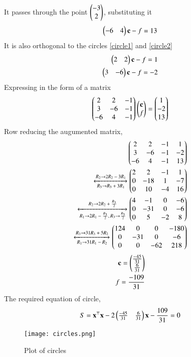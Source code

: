 \documentclass[journal,12pt,twocolumn]{IEEEtran}
\begin{document}
It passes through the point $\begin{pmatrix}-3\\2\end{pmatrix}$, substituting it
\begin{align}
    \begin{pmatrix}-6&4\end{pmatrix}\mathbf{c} - f = 13  
\end{align}
It is also orthogonal to the circles \eqref{circle1} and \eqref{circle2}
\begin{align}
    \begin{pmatrix}2&2\end{pmatrix}\mathbf{c} - f = 1\\
    \begin{pmatrix}3&-6\end{pmatrix}\mathbf{c} - f = -2
\end{align}
Expressing in the form of a matrix
\begin{align}
    \begin{pmatrix}2&2&-1\\3&-6&-1\\-6&4&-1\end{pmatrix}\begin{pmatrix}\mathbf{c}\\f\end{pmatrix} = \begin{pmatrix}1\\-2\\13\end{pmatrix}
\end{align}
Row reducing the augumented matrix,
\begin{align}
    \begin{pmatrix}2&2&-1&1\\3&-6&-1&-2\\-6&4&-1&13\end{pmatrix} \\ \xleftrightarrow[\text{$R_3$}\rightarrow{\text{$R_3 + 3R_1$}}] {\text{$R_2$}\rightarrow{\text{$2R_2 - 3R_1$}}} \begin{pmatrix}2&2&-1&1\\0&-18&1&-7\\0&10&-4&16\end{pmatrix}\\
    \xleftrightarrow[\text{$R_1$}\rightarrow{\text{$2R_1 - \frac{R_3}{2}$}} \text{$,R_3$}\rightarrow{\text{$\frac{R_3}{2}$}} ] {\text{$R_2$}\rightarrow{\text{$2R_2 + \frac{R_3}{2}$}}} \begin{pmatrix}4&-1&0&-6\\0&-31&0&-6\\0&5&-2&8\end{pmatrix}\\
    \xleftrightarrow[\text{$R_1$}\rightarrow{\text{$31R_1 - R_2$}}] {\text{$R_3$}\rightarrow{\text{$31R_3 + 5R_2$}}} \begin{pmatrix}124&0&0&-180\\0&-31&0&-6\\0&0&-62&218\end{pmatrix}
\end{align}
\begin{align}
    \mathbf{c} = \begin{pmatrix}\frac{-45}{31}\\\frac{6}{31}\end{pmatrix}\\
    f = \frac{-109}{31}
\end{align}
The required equation of circle,
\begin{align}
    S = \mathbf{x}^\top\mathbf{x} - 2\begin{pmatrix}\frac{-45}{31}&\frac{6}{31}\end{pmatrix}\mathbf{x} - \frac{109}{31} = 0
\end{align}
\begin{figure}[h!]
\centering
\texttt{[image: circles.png]}
\label{fig:circles plot}
\caption{Plot of circles}
\end{figure}
\end{document}
